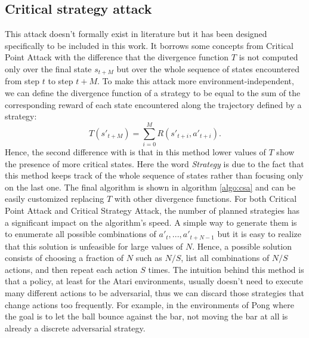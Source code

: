 \subsection{Critical strategy attack}
This attack doesn't formally exist in literature but it has been designed specifically to be included in this work. It borrows some concepts from Critical Point Attack with the difference that the divergence function \(T\) is not computed only over the final state \(s_{t+M}\) but over the whole sequence of states encountered from step \(t\) to step \(t+M\). To make this attack more environment-independent, we can define the divergence function of a strategy to be equal to the sum of the corresponding reward of each state encountered along the trajectory defined by a strategy:
\begin{equation}
T(s'_{t+M})=\sum_{i=0}^{M}R(s'_{t+i}, a'_{t+i}).
\end{equation}
Hence, the second difference with \cite{sun2020stealthy} is that in this method lower values of \(T\) show the presence of more critical states.
Here the word {\it Strategy} is due to the fact that this method keeps track of the whole sequence of states rather than focusing only on the last one.
The final algorithm is shown in algorithm \ref{algo:csa} and can be easily customized replacing \(T\) with other divergence functions. For both Critical Point Attack and Critical Strategy Attack, the number of planned strategies has a significant impact on the algorithm's speed. A simple way to generate them is to enumerate all possible combinations of \({a'_t,...,a'_{t+N-1}}\) but it is easy to realize that this solution is unfeasible for large values of \(N\). Hence, a possible solution consists of choosing a fraction of \(N\) such as \(N/S\), list all combinations of \(N/S\) actions, and then repeat each action \(S\) times. The intuition behind this method is that a policy, at least for the Atari environments, usually doesn't need to execute many different actions to be adversarial, thus we can discard those strategies that change actions too frequently. For example, in the environments of Pong where the goal is to let the ball bounce against the bar, not moving the bar at all is already a discrete adversarial strategy.

